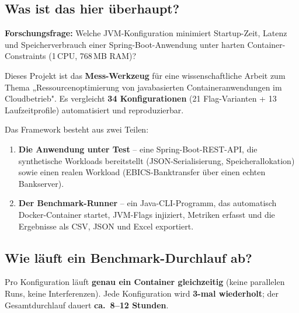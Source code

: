 \subsection{Was ist das hier überhaupt?}
\label{sec:was-ist-das}

\textbf{Forschungsfrage:} Welche JVM-Konfiguration minimiert Startup-Zeit,
Latenz und Speicherverbrauch einer Spring-Boot-Anwendung unter harten
Container-Constraints (1\,CPU, 768\,MB RAM)?

Dieses Projekt ist das \textbf{Mess-Werkzeug} für eine wissenschaftliche
Arbeit zum Thema „Ressourcenoptimierung von javabasierten
Containeranwendungen im Cloudbetrieb". Es vergleicht \textbf{34
	Konfigurationen} (21 Flag-Varianten + 13 Laufzeitprofile) automatisiert
und reproduzierbar.

Das Framework besteht aus zwei Teilen:

\begin{enumerate}
	\item
	      \textbf{Die Anwendung unter Test} -- eine Spring-Boot-REST-API, die
	      synthetische Workloads bereitstellt (JSON-Serialisierung,
	      Speicherallokation) sowie einen realen Workload (EBICS-Banktransfer
	      über einen echten Bankserver).
	\item
	      \textbf{Der Benchmark-Runner} -- ein Java-CLI-Programm, das
	      automatisch Docker-Container startet, JVM-Flags injiziert, Metriken
	      erfasst und die Ergebnisse als CSV, JSON und Excel exportiert.
\end{enumerate}

\subsection{Wie läuft ein Benchmark-Durchlauf ab?}
\label{sec:ablauf}

Pro Konfiguration läuft \textbf{genau ein Container gleichzeitig} (keine
parallelen Runs, keine Interferenzen). Jede Konfiguration wird
\textbf{3-mal wiederholt}; der Gesamtdurchlauf dauert \textbf{ca.\ 8–12
	Stunden}.

